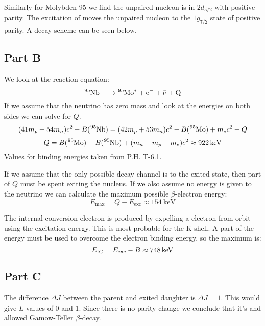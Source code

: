 \documentclass[a4paper, parskip=half, twopage]{scrartcl}
\begin{document}
Similarly for Molybden-95 we find the unpaired nucleon is in $2d_{5/2}$ with positive parity. The excitation of  moves the unpaired nucleon to the $1g_{7/2}$ state of positive parity. A decay scheme can be seen below.

\begin{center}
\end{center}

\subsection*{Part B}

We look at the reaction equation:
\[
\ce{^{95}Nb -> ^{95}Mo^* + e^- + \bar{\nu} + Q}
\]
If we assume that the neutrino has zero mass and look at the energies on both sides we can solve for $Q$.
\[
(41m_p + 54m_n)c^2 - B(\ce{^{95}Nb}) = (42m_p + 53m_n)c^2 - B(\ce{^{95}Mo}) + m_e c^2 + Q
\]
\[
Q = B(\ce{^{95}Mo}) - B(\ce{^{95}Nb}) + (m_n - m_p - m_e)c^2 \approx \SI{922}{\keV}
\]
Values for binding energies taken from P.H. T-6.1.

If we assume that the only possible decay channel is to the exited  state, then part of $Q$ must be spent exiting the nucleus. If we also assume no energy is given to the neutrino we can calculate the maximum possible $\beta$-electron energy:
\[
E_{\text{max}} = Q - E_{\text{exc}} \approx \SI{154}{\keV}
\]

The internal conversion electron is produced by expelling a electron from orbit using the excitation energy. This is most probable for the K-shell. A part of the energy must be used to overcome the electron binding energy, so the maximum is:
\[
E_{\text{\textsc{IC}}} = E_{\text{exc}} - B \approx \SI{748}{\keV}
\]

\subsection*{Part C}

The difference $\Delta J$ between the parent and exited daughter is $\Delta J = 1$. This would give $L$-values of 0 and 1. Since there is no parity change we conclude that it's and allowed Gamow-Teller $\beta$-decay.
\end{document}
